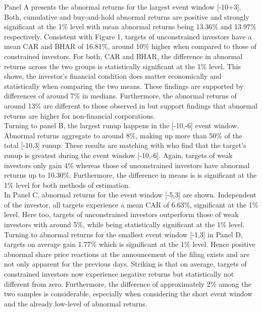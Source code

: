 \documentclass[12pt]{article}
\begin{document}
Panel A presents the abnormal returns for the largest event window [-10+3]. Both, cumulative and buy-and-hold abnormal returns are positive and strongly significant at the 1\% level with mean abnormal returns being 13.36\% and 13.97\% respectively. Consistent with Figure 1, targets of unconstrained investors have a mean CAR and BHAR of 16.81\%, around 10\% higher when compared to those of constrained investors. For both, CAR and BHAR, the difference in abnormal returns across the two groups is statistically significant at the 1\% level. This shows, the investor's financial condition does matter economically and statistically when comparing the two means. These findings are supported by differences of around 7\% in medians. Furthermore, the abnormal returns of around 13\% are different to those observed in \citet[p.208]{Klein2009} but support \citet[p.29]{Brigida2012} findings that abnormal returns are higher for non-financial corporations.\\
Turning to panel B, the largest runup happens in the [-10,-6] event window. Abnormal returns aggregate to around 8\%, making up more than 50\% of the total [-10,3] runup. These results are matching with \citet[p.32]{Brigida2012} who find that the target's runup is greatest during the event window [-10,-6]. Again, targets of weak investors only gain 4\% whereas those of unconstrained investors have abnormal returns up to 10.30\%. Furthermore, the difference in means is is significant at the 1\% level for both methods of estimation.\\
In Panel C, abnormal returns for the event window [-5,3] are shown. Independent of the investor, all targets experience a mean CAR of 6.63\%, significant at the 1\% level. Here too, targets of unconstrained investors outperform those of weak investors with around 5\%, while being statistically significant at the 1\% level.\\
Turning to abnormal returns for the smallest event window [-1,3] in Panel D, targets on average gain 1.77\% which is significant at the 1\% level. Hence positive abnormal share price reactions at the announcement of the filing exists and are not only apparent for the previous days. Striking is that on average, targets of constrained investors now experience negative returns but statistically not different from zero. Furthermore, the difference of approximately 2\%  among the two samples is considerable, especially  when considering the short event window and the already low-level of abnormal returns. 
\end{document}
